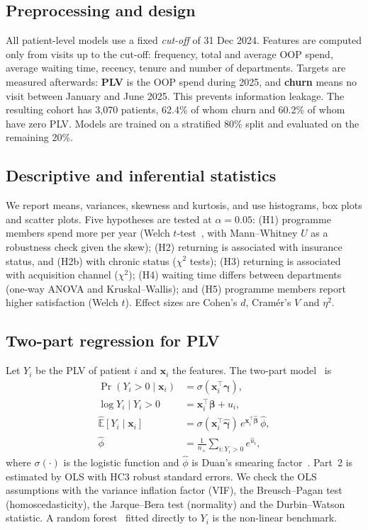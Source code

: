 \documentclass[conference]{IEEEtran}
\begin{document}
\subsection{Preprocessing and design}
All patient-level models use a fixed \emph{cut-off} of 31 Dec 2024. Features are computed only from visits up to the cut-off: frequency, total and average OOP spend, average waiting time, recency, tenure and number of departments. Targets are measured afterwards: \textbf{PLV} is the OOP spend during 2025, and \textbf{churn} means no visit between January and June 2025. This prevents information leakage. The resulting cohort has 3{,}070 patients, 62.4\% of whom churn and 60.2\% of whom have zero PLV. Models are trained on a stratified 80\% split and evaluated on the remaining 20\%.

\subsection{Descriptive and inferential statistics}
We report means, variances, skewness and kurtosis, and use histograms, box plots and scatter plots. Five hypotheses are tested at $\alpha=0.05$: (H1) programme members spend more per year (Welch $t$-test~\cite{welch1947}, with Mann--Whitney $U$ as a robustness check given the skew); (H2) returning is associated with insurance status, and (H2b) with chronic status ($\chi^2$ tests); (H3) returning is associated with acquisition channel ($\chi^2$); (H4) waiting time differs between departments (one-way ANOVA and Kruskal--Wallis); and (H5) programme members report higher satisfaction (Welch $t$). Effect sizes are Cohen's $d$, Cram\'er's $V$ and $\eta^2$.

\subsection{Two-part regression for PLV}
Let $Y_i$ be the PLV of patient $i$ and $\mathbf{x}_i$ the features. The two-part model~\cite{duan1983twopart} is
\begin{align}
\Pr(Y_i>0\mid\mathbf{x}_i) &= \sigma(\mathbf{x}_i^\top\boldsymbol{\gamma}),\\
\log Y_i \mid Y_i>0 &= \mathbf{x}_i^\top\boldsymbol{\beta}+u_i,\\
\widehat{\mathbb{E}}[Y_i\mid\mathbf{x}_i] &= \sigma(\mathbf{x}_i^\top\hat{\boldsymbol{\gamma}})\,
e^{\mathbf{x}_i^\top\hat{\boldsymbol{\beta}}}\,\hat{\phi},\\
\hat{\phi} &= \tfrac{1}{n_+}\textstyle\sum_{i:Y_i>0} e^{\hat u_i},
\end{align}
where $\sigma(\cdot)$ is the logistic function and $\hat\phi$ is Duan's smearing factor~\cite{duan1983smearing}. Part~2 is estimated by OLS with HC3 robust standard errors. We check the OLS assumptions with the variance inflation factor (VIF), the Breusch--Pagan test (homoscedasticity), the Jarque--Bera test (normality) and the Durbin--Watson statistic. A random forest~\cite{breiman2001} fitted directly to $Y_i$ is the non-linear benchmark.
\end{document}
